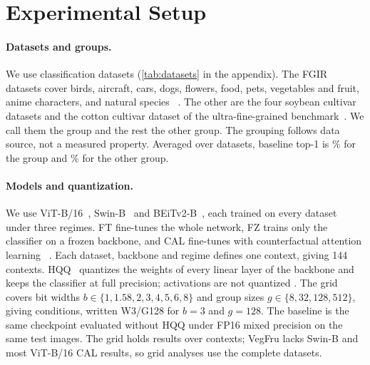 \section{Experimental Setup}
\label{sec:setup}

\paragraph{Datasets and groups.}
We use  classification datasets (\cref{tab:datasets} in the appendix).
The  FGIR datasets cover birds, aircraft, cars, dogs, flowers, food, pets, vegetables and fruit, anime characters, and natural species~\cite{wah2011cub,vanhorn2015nabirds,maji2013fine,krause2013cars,khosla2011dogs,nilsback2008flowers,bossard2014food,parkhi2012pets,hou2017vegfru,vanhorn2018inat} .
The other  are the four soybean cultivar datasets and the cotton cultivar dataset of the ultra-fine-grained benchmark~\cite{yu2021benchmark}.
We call them the \SC{} group and the rest the other group.
The grouping follows data source, not a measured property.
Averaged over datasets, baseline top-1 is \% for the \SC{} group and \% for the other group.

\paragraph{Models and quantization.}
We use ViT-B/16~\cite{dosovitskiy2021vit}, Swin-B~\cite{liu2021swin} and BEiTv2-B~\cite{peng2022beitv2}, each trained on every dataset under three regimes.
FT fine-tunes the whole network, FZ trains only the classifier on a frozen backbone, and CAL fine-tunes with counterfactual attention learning~\cite{rao2021cal} .
Each dataset, backbone and regime defines one context, giving 144 contexts.
HQQ~\cite{badri2023hqq} quantizes the weights of every linear layer of the backbone and keeps the classifier at full precision; activations are not quantized .
The grid covers bit widths $b \in \{1, 1.58, 2, 3, 4, 5, 6, 8\}$ and group sizes $g \in \{8, 32, 128, 512\}$, giving  conditions, written W3/G128 for $b=3$ and $g=128$.
The baseline is the same checkpoint evaluated without HQQ under FP16 mixed precision on the same test images.
The grid holds  results over  contexts; VegFru lacks Swin-B and most ViT-B/16 CAL results, so grid analyses use the  complete datasets.

